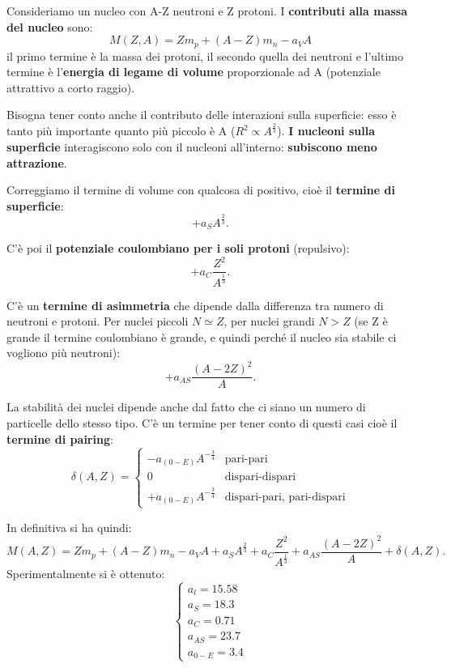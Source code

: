 \documentclass[a4paper,11pt,twoside,openany]{book}
\theoremstyle{definition}
\theoremstyle{plain}
\theoremstyle{plain}
\theoremstyle{definition}
\begin{document}
Consideriamo un nucleo con A-Z neutroni e Z protoni. I \textbf{contributi alla massa del nucleo} sono:
\begin{equation}
M(Z,A)=Zm_p+(A-Z)m_n-a_{V}A
\end{equation}
il primo termine è la massa dei protoni, il secondo quella dei neutroni e l'ultimo termine è l'\textbf{energia di legame di volume} proporzionale ad A (potenziale attrattivo a corto raggio).

Bisogna tener conto anche il contributo delle interazioni sulla superficie: esso è tanto più importante quanto più piccolo è A ($R^2\propto A^{\frac{2}{3}}$). \textbf{I nucleoni sulla superficie} interagiscono solo con il nucleoni all'interno: \textbf{subiscono meno attrazione}.

Correggiamo il termine di volume con qualcosa di positivo, cioè il \textbf{termine di superficie}: $$+a_SA^{\frac{2}{3}}.$$

C'è poi il \textbf{potenziale coulombiano per i soli protoni} (repulsivo): $$+a_C\frac{Z^2}{A^{\frac{1}{3}}}.$$

C'è un \textbf{termine di asimmetria} che dipende dalla differenza tra numero di neutroni e protoni. Per nuclei piccoli $N\simeq Z$, per nuclei grandi $N>Z$ (se Z è grande il termine coulombiano è grande, e quindi perché il nucleo sia stabile ci vogliono più neutroni): $$+a_{AS}\frac{(A-2Z)^2}{A}.$$

La stabilità dei nuclei dipende anche dal fatto che ci siano un numero di particelle dello stesso tipo. C'è un termine per tener conto di questi casi cioè il \textbf{termine di pairing}: 
\begin{equation*}
\delta(A,Z)=
\begin{cases}
-a_{(0-E)}A^{-\frac{3}{4}} & \textrm{pari-pari} \\
0 & \textrm{dispari-dispari} \\
+a_{(0-E)}A^{-\frac{3}{4}} & \textrm{dispari-pari, pari-dispari}
\end{cases}
\end{equation*}

In definitiva si ha quindi:
\begin{equation}
M(A,Z)=Zm_p+(A-Z)m_n-a_{V}A+a_SA^{\frac{2}{3}}+a_C\frac{Z^2}{A^{\frac{1}{3}}}+a_{AS}\frac{(A-2Z)^2}{A}+\delta(A,Z).
\end{equation}
Sperimentalmente si è ottenuto:
\begin{equation}
\begin{cases}
a_l=15.58\\
a_S=18.3\\
a_C=0.71\\
a_{AS}=23.7\\
a_{0-E}=3.4
\end{cases}
\end{equation}
\end{document}

